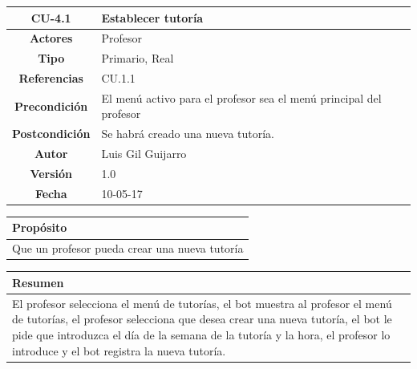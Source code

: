 \begin{table}[!ht]

\begin{tabular}{|c|m{10cm}|}
\hline\rowcolor{Gray}
{\bf CU-4.1 } & { Establecer tutoría}\\
\hline
{\bf Actores } & { Profesor} \\
\hline\rowcolor{Gray}
{\bf Tipo } & { Primario, Real} \\
\hline
{\bf Referencias }& {CU.1.1} \\
\hline\rowcolor{Gray}
{\bf Precondición }& {El menú activo para el profesor sea el menú principal del profesor} \\
\hline
{\bf Postcondición }& {Se habrá creado una nueva tutoría.}\\
\hline\rowcolor{Gray}
{\bf Autor }& { Luis Gil Guijarro}  \\
\hline
{\bf Versión }& { 1.0} \\
\hline\rowcolor{Gray}
{\bf Fecha }& { 10-05-17} \\
\hline
\end{tabular}

\end{table}

\begin{table}[!ht]

\begin{tabular}{|m{10cm}|}
\hline\rowcolor{Gray}
{\bf Propósito}\\
\hline
{Que un profesor pueda crear una nueva tutoría} \\
\hline

\end{tabular}


\end{table}

\begin{table}[!ht]

\begin{tabular}{|m{10cm}|}
\hline\rowcolor{Gray}
{\bf Resumen}\\
\hline
{El profesor selecciona el menú de tutorías, el bot muestra al profesor el menú de tutorías, el profesor selecciona que desea crear una nueva tutoría, el bot le pide que introduzca el día de la semana de la tutoría y la hora, el profesor lo introduce y el bot registra la nueva tutoría.} \\
\hline

\end{tabular}



\end{table}


